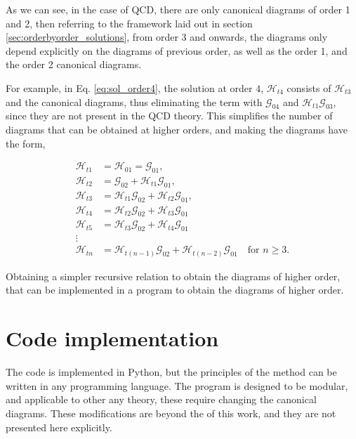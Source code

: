 \documentclass[11pt,a4paper,twoside,pdf]{article}
\numberwithin{equation}{section}
\begin{document}
As we can see, in the case of QCD, there are only canonical diagrams of order 1 and 2, 
then referring to the framework laid out in section \ref{sec:orderbyorder_solutions}, 
from order 3  and onwards, the diagrams only depend explicitly on the diagrams of 
previous order, as well as the order 1, and the order 2 canonical diagrams.

For example, in Eq. \eqref{eq:sol_order4}, the solution at order $4$, $\mathcal{H}_{t4}$ consists of 
$\mathcal{H}_{t 3}$ and the canonical diagrams, thus eliminating the term with $\mathcal{G}_{04}$ and
$\mathcal{H}_{t1}\mathcal{G}_{03}$, since they are not present in the QCD theory.
This simplifies the number of diagrams that can be obtained at higher orders,
and making the diagrams have the form,

\begin{align}
    \mathcal{H}_{t1} & = \mathcal{H}_{01} = \mathcal{G}_{01}, \\
    \mathcal{H}_{t2} & = \mathcal{G}_{02} + \mathcal{H}_{t1} \mathcal{G}_{01}, \\
    \mathcal{H}_{t3} & =  \mathcal{H}_{t1} \mathcal{G}_{02} + 
    \mathcal{H}_{t2} \mathcal{G}_{01}, \\
    \mathcal{H}_{t4} & =  \mathcal{H}_{t2} \mathcal{G}_{02} + \mathcal{H}_{t3} \mathcal{G}_{01}\\
    \mathcal{H}_{t5} & =  \mathcal{H}_{t3} \mathcal{G}_{02} + \mathcal{H}_{t4} \mathcal{G}_{01} \\
    \vdots & \nonumber\\
    \mathcal{H}_{tn} &=  \mathcal{H}_{t(n-1)} \mathcal{G}_{02} +
    \mathcal{H}_{t(n-2)} \mathcal{G}_{01} \quad \text{for } n \geq 3.
\end{align}

Obtaining a simpler recursive relation to obtain the diagrams of higher order,
that can be implemented in a program to obtain the diagrams of higher order.

\newpage

\section{Code implementation} \label{sec:code}

The code is implemented in Python, but the principles of the method can be written in any 
programming language. The program is designed to be modular, and applicable to
other any theory, these require changing the canonical
diagrams. These modifications are beyond the of this work, and they are not presented
here explicitly.
\end{document}
